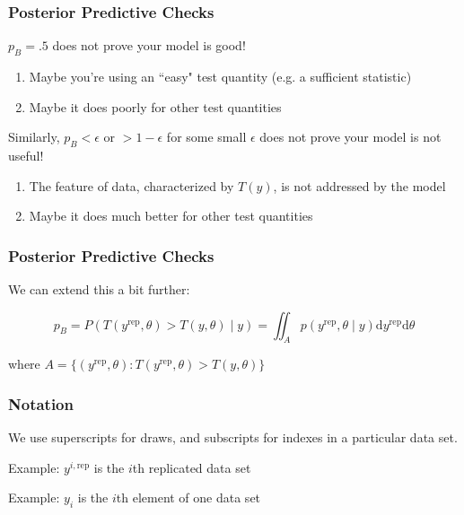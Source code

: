 \documentclass{beamer}
\begin{document}
\begin{frame}
\frametitle{Posterior Predictive Checks}

$p_B = .5$ does not \*prove\* your model is good! 
\begin{enumerate}
\item Maybe you're using an ``easy" test quantity (e.g. a sufficient statistic)
\item Maybe it does poorly for other test quantities
\end{enumerate}

Similarly, $p_B < \epsilon$ or $> 1 - \epsilon$ for some
small $\epsilon$ does not \*prove\* your model is not useful!
\begin{enumerate}
\item The feature of data, characterized by $T(y)$, is not addressed
  by the model
\item Maybe it does much better for other test quantities
\end{enumerate}


\end{frame}


\begin{frame}
\frametitle{Posterior Predictive Checks}

We can extend this a bit further:

\[
p_B = P(T(y^{\text{rep}}, \theta) > T(y, \theta) \mid y) = \iint_{A} p(y^{\text{rep}}, \theta \mid y) \text{d} y^{\text{rep}}\text{d} \theta
\]

where $A = \{(y^{\text{rep}}, \theta) : T(y^{\text{rep}}, \theta) > T(y, \theta) \}$

\end{frame}



\begin{frame}
\frametitle{Notation}

We use superscripts for draws, and subscripts for indexes in a particular data set.
\newline

Example: $y^{i,\text{rep}}$ is the $i$th replicated data set
\newline

Example: $y_i$ is the $i$th element of one data set

\end{frame}
\end{document}
